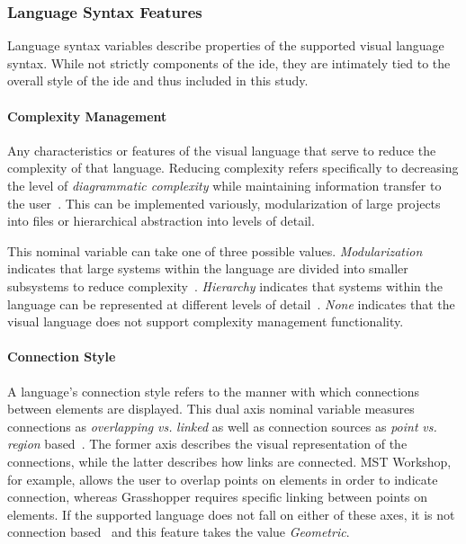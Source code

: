 \subsubsection{Language Syntax Features} \label{subsubsec:languagesyntax}

Language syntax variables describe properties of the supported visual
language syntax. While not strictly components of the \ac{ide}, they are
intimately tied to the overall style of the \ac{ide} and thus included in this
study.


\paragraph{Complexity Management}
Any characteristics or features of the
visual language that serve to reduce the complexity of that language.
Reducing complexity refers specifically to decreasing the level of
\emph{diagrammatic complexity} while maintaining information transfer to
the user~\cite{moody2009}. This can be implemented variously, \eg
modularization of large projects into files or hierarchical abstraction
into levels of detail.

This nominal variable can take one of three possible values.
\textsl{Modularization} indicates that large systems within the language
are divided into smaller subsystems to reduce complexity~\cite{moody2009}.
\textsl{Hierarchy} indicates that systems within the language can be
represented at different levels of detail~\cite{moody2009}. \textsl{None}
indicates that the visual language does not support complexity management
functionality.


\paragraph{Connection Style}
A language's connection style refers to the manner with which connections
between elements are displayed. This dual axis nominal variable measures
connections as \textsl{overlapping} \emph{vs.} \textsl{linked} as well as
connection sources as \textsl{point} \emph{vs.} \textsl{region}
based~\cite{costagliola2002}. The former axis describes the visual
representation of the connections, while the latter describes how links are
connected. MST Workshop, for example, allows the user to overlap points on
elements in order to indicate connection, whereas Grasshopper requires
specific linking between points on elements. If the supported language
does not fall on either of these axes, it is not connection
based~\cite{costagliola2002} and this feature takes the value
\textsl{Geometric}.


